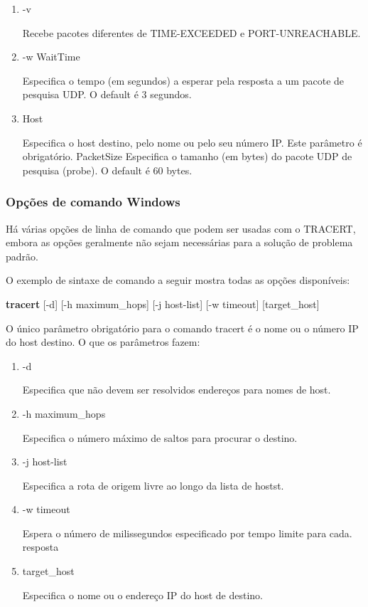 \documentclass[
	article,			%
	11pt,				%
	oneside,			%
	a4paper,			%
	english,			%
	brazil,				%
	sumario=tradicional
	]{abntex2}
\begin{document}
\begin{enumerate}
	\item -v
	
	Recebe pacotes diferentes de TIME-EXCEEDED e PORT-UNREACHABLE.
	
	\item -w WaitTime 
	
	Especifica o tempo (em segundos) a esperar pela resposta a um pacote de pesquisa UDP. O default é 3 segundos.
	
	
	\item Host      
	
	Especifica o host destino, pelo nome ou pelo seu número IP. Este parâmetro é obrigatório. PacketSize Especifica o tamanho (em bytes)  do pacote UDP de pesquisa (probe). O default é 60 bytes.     
\end{enumerate}                    


\subsubsection{Opções de comando Windows}
Há várias opções de linha de comando que podem ser usadas com o TRACERT, embora as opções geralmente não sejam necessárias para a solução de problema padrão.

O exemplo de sintaxe de comando a seguir mostra todas as opções disponíveis:

\textbf{tracert} [-d] [-h maximum\_hops] [-j host-list] [-w timeout] [target\_host]

O único parâmetro obrigatório para o comando tracert é o nome ou o número IP do host destino. O que os parâmetros fazem:

\begin{enumerate}
	\item -d
	
	Especifica que não devem ser resolvidos endereços para nomes de host.
	
	\item -h maximum\_hops
	
	 Especifica o número máximo de saltos para procurar o destino.
	 
	\item -j host-list
	
      Especifica a rota de origem livre ao longo da lista de hostst.
	
	\item -w timeout 
	
	Espera o número de milissegundos especificado por tempo limite para cada.
	resposta

	\item target\_host
	      
	 Especifica o nome ou o endereço IP do host de destino.   
\end{enumerate}                    
\end{document}
